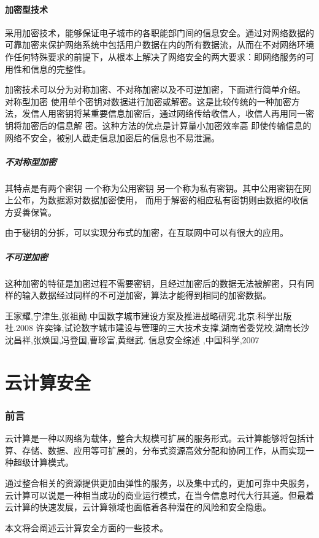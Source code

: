 \documentclass[a4paper]{ctexart}
\begin{document}
    \subsection{加密型技术}
    \par 采用加密技术，能够保证电子城市的各职能部门间的信息安全。通过对网络数据的可靠加密来保护网络系统中包括用户数据在内的所有数据流，从而在不对网络环境作任何特殊要求的前提下，从根本上解决了网络安全的两大要求：即网络服务的可用性和信息的完整性。
    \par 加密技术可以分为对称加密、不对称加密以及不可逆加密，下面进行简单介绍。 
    对称型加密 使用单个密钥对数据进行加密或解密。这是比较传统的一种加密方法，发信人用密钥将某重要信息加密后，通过网络传给收信人，收信人再用同一密钥将加密后的信息解 密。这种方法的优点是计算量小加密效率高 即使传输信息的网络不安全，被别人截走信息加密后的信息也不易泄漏。

    \subsubsection{不对称型加密} 
    \par 其特点是有两个密钥 一个称为公用密钥 另一个称为私有密钥。其中公用密钥在网上公布，为数据源对数据加密使用， 而用于解密的相应私有密钥则由数据的收信方妥善保管。
    \par 由于秘钥的分拆，可以实现分布式的加密，在互联网中可以有很大的应用。

    \subsubsection{不可逆加密} 
    \par 这种加密的特征是加密过程不需要密钥，且经过加密后的数据无法被解密，只有同样的输入数据经过同样的不可逆加密，算法才能得到相同的加密数据。


    \begin{thebibliography}{sotief}
             王家耀,宁津生,张祖勋.中国数字城市建设方案及推进战略研究.北京:科学出版社.2008
            许奕锋,试论数字城市建设与管理的三大技术支撑,湖南省委党校,湖南长沙
             沈昌祥,张焕国,冯登国,曹珍富,黄继武. 信息安全综述 ,中国科学,2007
    \end{thebibliography}

    \part{云计算安全}
    \section{前言}
    \par 云计算是一种以网络为载体，整合大规模可扩展的服务形式。云计算能够将包括计算、存储、数据、应用等可扩展的，分布式资源高效分配和协同工作，从而实现一种超级计算模式。 
    \par 通过整合相关的资源提供更加由弹性的服务，以及集中式的，更加可靠中央服务，云计算可以说是一种相当成功的商业运行模式，在当今信息时代大行其道。但最着云计算的快速发展，云计算领域也面临着各种潜在的风险和安全隐患。 
    \par 本文将会阐述云计算安全方面的一些技术。 
\end{document}
